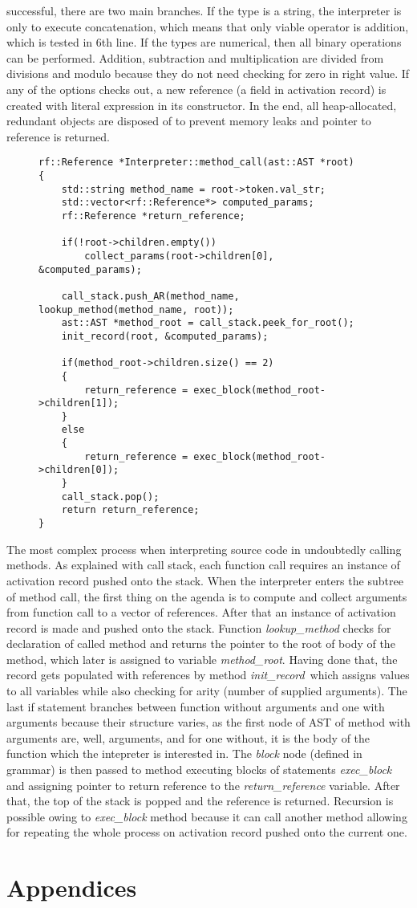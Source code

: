 \documentclass[12pt]{article}
\begin{document}
successful, there are two main branches. If the type is a string, the interpreter is only to execute concatenation, which 
means that only viable operator is addition, which is tested in 6th line. If the types are numerical, then all binary operations 
can be performed. Addition, subtraction and multiplication are divided from divisions and modulo because they do not need checking 
for zero in right value. If any of the options checks out, a new reference (a field in activation record) is created with 
literal expression in its constructor. In the end, all heap-allocated, redundant objects are disposed of to prevent memory leaks and
pointer to reference is returned.
\begin{figure}[H]
    \caption{}
    \label{snip_1}
    \begin{verbatim}
rf::Reference *Interpreter::method_call(ast::AST *root)
{
    std::string method_name = root->token.val_str;
    std::vector<rf::Reference*> computed_params;
    rf::Reference *return_reference;

    if(!root->children.empty())
        collect_params(root->children[0], &computed_params);

    call_stack.push_AR(method_name, lookup_method(method_name, root));
    ast::AST *method_root = call_stack.peek_for_root();
    init_record(root, &computed_params);

    if(method_root->children.size() == 2)
    {
        return_reference = exec_block(method_root->children[1]);
    }
    else
    {
        return_reference = exec_block(method_root->children[0]);
    }
    call_stack.pop();
    return return_reference;
}
    \end{verbatim}
\end{figure}
The most complex process when interpreting source code in undoubtedly calling methods. As explained with call stack, each function
call requires an instance of activation record pushed onto the stack. When the interpreter enters the subtree of method call, the 
first thing on the agenda is to compute and collect arguments from function call to a vector of references. After that an instance
of activation record is made and pushed onto the stack. Function \emph{lookup\_method} checks for declaration of called method and returns
the pointer to the root of body of the method, which later is assigned to variable \emph{method\_root}. Having done that, the record gets 
populated with references by method \emph{init\_record} which assigns values to all variables while also checking for arity (number of 
supplied arguments). The last if statement branches between function without arguments and one with arguments because their structure varies, as
the first node of AST of method with arguments are, well, arguments, and for one without, it is the body of the function which the 
intepreter is interested in. The \emph{block} node (defined in grammar) is then passed to method executing blocks of statements 
\emph{exec\_block} and assigning pointer to return reference to the \emph{return\_reference} variable. After that, the top of the stack is 
popped and the reference is returned. Recursion is possible owing to \emph{exec\_block} method because it can call another method
allowing for repeating the whole process on activation record pushed onto the current one.
\section{Appendices}
\end{document}
